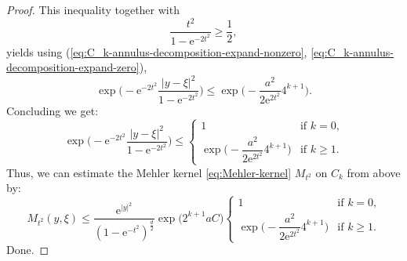 \documentclass[a4paper,oneside,10pt]{amsproc}
\theoremstyle{plain}
\theoremstyle{remark}
\theoremstyle{definition}
\renewcommand{\leq}{\leqslant}
\renewcommand{\leq}{\leqslant}
\renewcommand{\geq}{\geqslant}
\newcommand{\e}{\mathrm{e}} %
\renewcommand{\leq}{\leqslant}%
\renewcommand{\geq}{\geqslant}%
\begin{document}
\begin{proof}
  This inequality together with
  \begin{equation*}
    \frac{t^2}{1 - \e^{-2t^2}} \geq \frac12,
  \end{equation*}
  yields using (\ref{eq:C_k-annulus-decomposition-expand-nonzero},
  \ref{eq:C_k-annulus-decomposition-expand-zero}),
  \begin{equation*}
    \exp\biggl(-\e^{-2t^2} \dfrac{|y - \xi|^2}{1 - \e^{-2t^2}}  \biggr)
    \leq \exp\biggl(-\dfrac{a^2}{2 \e^{2 t^2}} 4^{k + 1} \biggr).
  \end{equation*}
  Concluding we get:
  \begin{equation*}
    \exp\biggl(-\e^{-2t^2}\frac{|y - \xi|^2}{1 - \e^{-2t^2}} \biggr) \leq
    \begin{cases}
      1 &\text{if $k = 0$,}\\
      \exp\biggl(-\dfrac{a^2}{2 \e^{2t^2}} 4^{k + 1} \biggr) &\text{if $k
        \geq 1$.}
    \end{cases}
  \end{equation*}
  Thus, we can estimate the Mehler kernel \eqref{eq:Mehler-kernel}
  $M_{t^2}$ on $C_k$ from above by:
  \begin{equation*}
    M_{t^2}(y, \xi) \leq \frac{\e^{|y|^2}}{(1 - \e^{-t^2})^{\frac{d}2}}
    \exp\bigl(2^{k + 1} a C \bigr)
    \begin{cases}
      1 &\text{if $k = 0$,}\\
      \exp\biggl(-\dfrac{a^2}{2 \e^{2t^2}} 4^{k + 1} \biggr) &\text{if $k
        \geq 1$.}
    \end{cases}
  \end{equation*}
  Done.
\end{proof}
\end{document}
